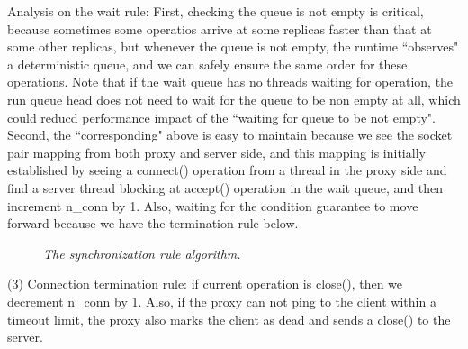 Analysis on the wait rule: First, checking the \paxos queue is not 
empty is critical, because sometimes some operatios arrive at some replicas 
faster than that at some other replicas, but whenever the \paxos queue is not 
empty, the \smt runtime ``observes" a deterministic \paxos queue, and
we can safely ensure the same order for these \paxos operations.
Note that if the wait queue has no threads waiting for \paxos operation, the 
run queue head does not need to wait for the \paxos queue to be non empty at 
all, which could reducd performance impact of the ``waiting for \paxos queue to be not empty".
Second, the ``corresponding" above is easy to maintain because we see the socket pair mapping from 
both proxy and server side, and this mapping is initially established by seeing 
a connect() operation from a thread in the proxy side and find a server thread blocking at accept() 
operation in the wait queue, and then increment n\_conn by 1. Also, waiting for the 
condition guarantee to move forward because we have the termination rule below.

\begin{figure}[t]
\centering
\begin{minipage}{.5\textwidth}
\end{minipage}
\vspace{-.1in}
\caption{{\em The synchronization rule algorithm.}} \label{fig:msmr-wait-rule}
\vspace{-.05in}
\end{figure}

(3) Connection termination rule: if current \paxos operation is close(), then 
we decrement n\_conn by 1. Also, if 
the proxy can not ping to the client within a timeout limit, the proxy also 
marks the client as dead and sends a close() to the server.


